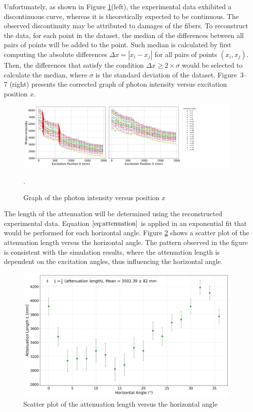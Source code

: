     Unfortunately, as shown in Figure \ref{jump}(left), the experimental data exhibited a discontinuous curve, whereas it is theoretically expected to be continuous. The observed discontinuity may be attributed to damages of the fibers. To reconstruct the data, for each point in the dataset, the median of the differences between all pairs of points will be added to the point. Such median is calculated by first computing the absolute differences \( \Delta x = |x_i - x_j| \) for all pairs of points \( (x_i, x_j) \). Then, the differences that satisfy the condition \( \Delta x \geq 2 \times \sigma \) would be selected to calculate the median, where \( \sigma \) is the standard deviation of the dataset. Figure~3--7 (right) presents the corrected graph of photon intensity versus excitation position \( x \).


    \begin{figure}[H]
        \centering
        \includegraphics[scale=0.4]{Figure/jump.png}
        \caption{Graph of the  photon intensity versus position \( x \)}.
        \label{jump}
    \end{figure}

    The length of the attenuation will be determined using the reconstructed experimental data. Equation \(\ref{eq:attenuation}\) is applied in an exponential fit that would be performed for each horizontal angle. Figure \ref{l} shows a scatter plot of the attenuation length versus the horizontal angle. The pattern observed in the figure is consistent with the simulation results, where the attenuation length is dependent on the excitation angles, thus influencing the horizontal angle.
    
    \begin{figure}[H]
        \centering
        \includegraphics[scale=0.3]{Figure/l-fit.png}
        \caption{Scatter plot of the attenuation length versus the horizontal angle}
        \label{l}
    \end{figure}

